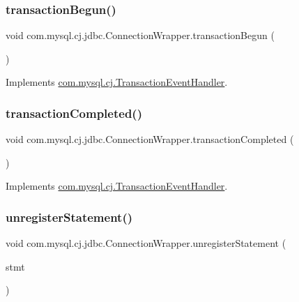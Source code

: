 \subsubsection{\texorpdfstring{transaction\+Begun()}{transactionBegun()}}
{\footnotesize\ttfamily void com.\+mysql.\+cj.\+jdbc.\+Connection\+Wrapper.\+transaction\+Begun (\begin{DoxyParamCaption}{ }\end{DoxyParamCaption})}



Implements \mbox{\hyperlink{interfacecom_1_1mysql_1_1cj_1_1_transaction_event_handler_a4c745069ad52c307d91f62b3ebff5c01}{com.\+mysql.\+cj.\+Transaction\+Event\+Handler}}.

\mbox{\label{classcom_1_1mysql_1_1cj_1_1jdbc_1_1_connection_wrapper_a88a3cbba3f3812a1a2023075e8ecfc36}} 
\subsubsection{\texorpdfstring{transaction\+Completed()}{transactionCompleted()}}
{\footnotesize\ttfamily void com.\+mysql.\+cj.\+jdbc.\+Connection\+Wrapper.\+transaction\+Completed (\begin{DoxyParamCaption}{ }\end{DoxyParamCaption})}



Implements \mbox{\hyperlink{interfacecom_1_1mysql_1_1cj_1_1_transaction_event_handler_ac0775d70699a27ec6a8a7954e64b86f8}{com.\+mysql.\+cj.\+Transaction\+Event\+Handler}}.

\mbox{\label{classcom_1_1mysql_1_1cj_1_1jdbc_1_1_connection_wrapper_a9a858e59cd764a87a74f9e4d5b28dad9}} 
\subsubsection{\texorpdfstring{unregister\+Statement()}{unregisterStatement()}}
{\footnotesize\ttfamily void com.\+mysql.\+cj.\+jdbc.\+Connection\+Wrapper.\+unregister\+Statement (\begin{DoxyParamCaption}\item[{\mbox{\hyperlink{interfacecom_1_1mysql_1_1cj_1_1jdbc_1_1_jdbc_statement}{com.\+mysql.\+cj.\+jdbc.\+Jdbc\+Statement}}}]{stmt }\end{DoxyParamCaption})}

